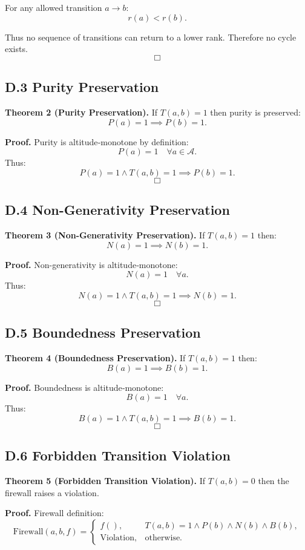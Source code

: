 For any allowed transition $a \to b$:
\[
r(a) < r(b).
\]

Thus no sequence of transitions can return to a lower rank.  
Therefore no cycle exists.  
\[
\Box
\]

\subsection*{D.3 Purity Preservation}

\textbf{Theorem 2 (Purity Preservation).}  
If $T(a,b)=1$ then purity is preserved:
\[
P(a)=1 \implies P(b)=1.
\]

\textbf{Proof.}  
Purity is altitude‑monotone by definition:
\[
P(a)=1 \quad \forall a \in \mathcal{A}.
\]
Thus:
\[
P(a)=1 \land T(a,b)=1 \implies P(b)=1.
\]
\[
\Box
\]

\subsection*{D.4 Non-Generativity Preservation}

\textbf{Theorem 3 (Non-Generativity Preservation).}  
If $T(a,b)=1$ then:
\[
N(a)=1 \implies N(b)=1.
\]

\textbf{Proof.}  
Non-generativity is altitude‑monotone:
\[
N(a)=1 \quad \forall a.
\]
Thus:
\[
N(a)=1 \land T(a,b)=1 \implies N(b)=1.
\]
\[
\Box
\]

\subsection*{D.5 Boundedness Preservation}

\textbf{Theorem 4 (Boundedness Preservation).}  
If $T(a,b)=1$ then:
\[
B(a)=1 \implies B(b)=1.
\]

\textbf{Proof.}  
Boundedness is altitude‑monotone:
\[
B(a)=1 \quad \forall a.
\]
Thus:
\[
B(a)=1 \land T(a,b)=1 \implies B(b)=1.
\]
\[
\Box
\]

\subsection*{D.6 Forbidden Transition Violation}

\textbf{Theorem 5 (Forbidden Transition Violation).}  
If $T(a,b)=0$ then the firewall raises a violation.

\textbf{Proof.}  
Firewall definition:
\[
\mathrm{Firewall}(a,b,f) =
\begin{cases}
f(), & T(a,b)=1 \land P(b) \land N(b) \land B(b), \\
\mathrm{Violation}, & \text{otherwise}.
\end{cases}
\]

